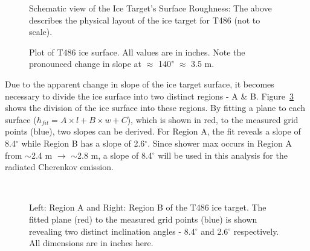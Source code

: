 \begin{figure}[htbp]
\centering
\epsfxsize=4.5in
\caption{Schematic view of the Ice Target's Surface Roughness:  The above describes the physical layout of the ice target for T486 (not to scale).}
\label{fig:IceSurfaceGrid}
\end{figure}

\begin{figure}[htbp]
\centering
\epsfxsize=4.5in
\caption{Plot of T486 ice surface.  All values are in inches.  Note the pronounced change in slope at $\approx$ 140" $\approx$ 3.5 m.}
\label{fig:IceSurfacePlot}
\end{figure}

\par Due to the apparent change in slope of the ice target surface, it becomes necessary to divide the ice surface into two distinct regions - A \& B.  Figure~\ref{fig:iceSlopes} shows the division of the ice surface into these regions.  By fitting a plane to each surface ($h_{fit} = A \times l + B \times w + C$), which is shown in red, to the measured grid points (blue), two slopes can be derived.  For Region A, the fit reveals a slope of 8.4$^\circ$ while Region B has a slope of 2.6$^\circ$.  Since shower max occurs in Region A from $\sim$2.4 m $\rightarrow$ $\sim$2.8 m, a slope of 8.4$^\circ$ will be used in this analysis for the radiated Cherenkov emission.

\begin{figure}[htbp]
\centerline{
\mbox{
\epsfxsize=3.0in
\epsfxsize=3.0in
}}
\caption{Left:  Region A and Right: Region B of the T486 ice target.  The fitted plane (red) to the measured grid points (blue) is shown revealing two distinct inclination angles - 8.4$^\circ$ and 2.6$^\circ$ respectively.  All dimensions are in inches here.}
\label{fig:iceSlopes}
\end{figure}